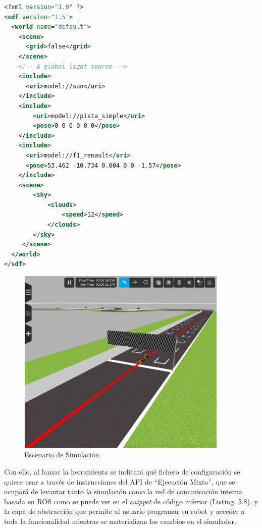 \begin{lstlisting}[language=XML, caption=Configuración de Lanzamiento de Simulaciones]
<?xml version="1.0" ?>
<sdf version="1.5">
  <world name="default">
    <scene>
      <grid>false</grid>
    </scene>
    <!-- A global light source -->
    <include>
      <uri>model://sun</uri>
    </include>
    <include>
	    <uri>model://pista_simple</uri>
	    <pose>0 0 0 0 0 0</pose>
    </include>
    <include>
      <uri>model://f1_renault</uri>
      <pose>53.462 -10.734 0.004 0 0 -1.57</pose>
    </include>
    <scene>
        <sky>
            <clouds>
                <speed>12</speed>
            </clouds>
        </sky>
     </scene>
  </world>
</sdf>
\end{lstlisting}

\begin{figure}[!hbtp]  \centering\noindent
    \includegraphics[width=0.9\textwidth]{figures/world_gazebo.png}
    \caption{Escenario de Simulación}
    \label{gzworld}
\end{figure}

Con ello, al lanzar la herramienta se indicará qué fichero de configuración se quiere usar a través de instrucciones del API de ``Ejecución Mixta'', que se ocupará de levantar tanto la simulación como la red de comunicación interna basada en ROS como se puede ver en el \textit{snippet} de código inferior (Listing. 5.8), y la capa de abstracción que permite al usuario programar su robot y acceder a toda la funcionalidad mientras se materializan los cambios en el simulador.

